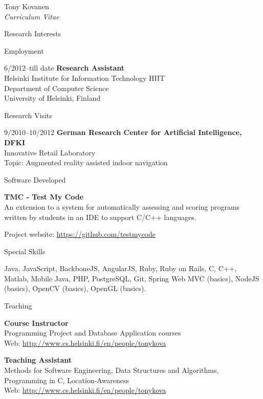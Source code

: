 \documentclass[10pt]{article}
\begin{document}
\begin{cv}{Tony Kovanen\\{\large \itshape Curriculum Vitae}}
\begin{cvlist}{Research Interests}
\end{cvlist}

\newpage
\begin{cvlist}{Employment}
	\item[6/2012--till date] {\bf Research Assistant}\\
	Helsinki Institute for Information Technology HIIT\\
	Department of Computer Science\\
	University of Helsinki, Finland

\end{cvlist}

\begin{cvlist}{Research Visits}
	\item[9/2010--10/2012] {\bf German Research Center for Artificial Intelligence, DFKI}\\		
		Innovative Retail Laboratory\\	
		Topic: Augmented reality assisted indoor navigation
\end{cvlist}

\begin{cvlist}{Software Developed}
	\item \textbf{TMC - Test My Code}\\
    An extension to a system for automatically assessing and scoring programs written by students in an IDE to support C/C++ languages. 
	\item Project website: \url{https://github.com/testmycode}	
\end{cvlist}

\begin{cvlist}{Special Skills}
\item Java, JavaScript, BackboneJS, AngularJS, Ruby, Ruby on Rails, C, C++, Matlab, Mobile Java, PHP, PostgreSQL, Git, Spring Web MVC (basics), NodeJS (basics), OpenCV (basics), OpenGL (basics). 
\end{cvlist}

\begin{cvlist}{Teaching}
	\item {\bf Course Instructor}\\
	Programming Project and Database Application courses\\
	Web: \url{http://www.cs.helsinki.fi/en/people/tonykova}
		
	\item {\bf Teaching Assistant}\\
		Methods for Software Engineering, Data Structures and Algorithms, Programming in C, Location-Awareness\\
		Web: \url{http://www.cs.helsinki.fi/en/people/tonykova}
		

\end{cvlist}
\end{cv}
\end{document}
